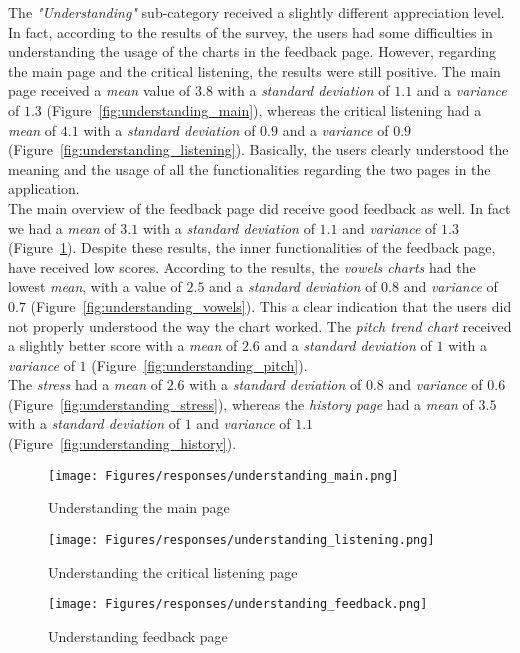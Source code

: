 \noindent The \textit{"Understanding"} sub-category received a slightly different appreciation level. In fact, according to the results of the survey, the users had some difficulties in understanding the usage of the charts in the feedback page. However, regarding the main page and the critical listening, the results were still positive. The main page received a \textit{mean} value of $3.8$ with a \textit{standard deviation} of $1.1$ and a \textit{variance} of $1.3$ (Figure~\ref{fig:understanding_main}), whereas the critical listening had a \textit{mean} of $4.1$ with a \textit{standard deviation} of $0.9$ and a \textit{variance} of $0.9$ (Figure~\ref{fig:understanding_listening}). Basically, the users clearly understood the meaning and the usage of all the functionalities regarding the two pages in the application. \\
\noindent The main overview of the feedback page did receive good feedback as well. In fact we had a \textit{mean} of $3.1$ with a \textit{standard deviation} of $1.1$ and \textit{variance} of $1.3$ (Figure~\ref{fig:understanding_feedback}). Despite these results, the inner functionalities of the feedback page, have received low scores. According to the results, the \textit{vowels charts} had the lowest \textit{mean}, with a value of $2.5$ and a \textit{standard deviation} of $0.8$ and \textit{variance} of $0.7$ (Figure~\ref{fig:understanding_vowels}). This a clear indication that the users did not properly understood the way the chart worked. The \textit{pitch trend chart} received a slightly better score with a \textit{mean} of $2.6$ and a \textit{standard deviation} of $1$ with a \textit{variance} of $1$ (Figure~\ref{fig:understanding_pitch}). \\
\noindent The \textit{stress} had a \textit{mean} of $2.6$ with a \textit{standard deviation} of $0.8$ and \textit{variance} of $0.6$ (Figure~\ref{fig:understanding_stress}), whereas the \textit{history page} had a \textit{mean} of $3.5$ with a \textit{standard deviation} of $1$ and \textit{variance} of $1.1$ (Figure~\ref{fig:understanding_history}).

\begin{figure}[!ht]
	\centering
	\begin{minipage}{.5\textwidth}
		\centering
		\texttt{[image: Figures/responses/understanding\_main.png]}
		\caption{Understanding the main page}
		\label{fig:understanding_main}
	\end{minipage}%
	\begin{minipage}{.5\textwidth}
		\centering
		\texttt{[image: Figures/responses/understanding\_listening.png]}
		\caption{Understanding the critical listening page}
		\label{fig:understanding_listening}
	\end{minipage}
	\begin{minipage}{.5\textwidth}
		\centering
		\texttt{[image: Figures/responses/understanding\_feedback.png]}
		\caption{Understanding feedback page}
		\label{fig:understanding_feedback}
	\end{minipage}%
\end{figure}

